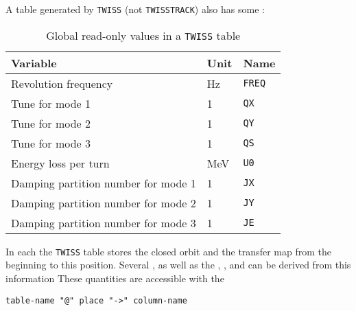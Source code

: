 A table generated by \texttt{TWISS} (not \texttt{TWISSTRACK})
also has some :
\begin{table}[Ht] \footnotesize
  \begin{center}
    \caption{Global read-only values in a \texttt{TWISS} table}
    \label{tab:twiss-glob}
    \begin{tabular}{|l|l|l|}
      \hline
      Variable & Unit & Name \\
      \hline
      Revolution frequency & Hz & \texttt{FREQ}\index{FREQ} \\
      Tune for mode 1 & 1 & \texttt{QX}\index{QX} \\
      Tune for mode 2 & 1 & \texttt{QY}\index{QY} \\
      Tune for mode 3 & 1 & \texttt{QS}\index{QS} \\
      Energy loss per turn & MeV & \texttt{U0}\index{U0} \\
      Damping partition number for mode 1 & 1 & \texttt{JX}\index{JX} \\
      Damping partition number for mode 2 & 1 & \texttt{JY}\index{JY} \\
      Damping partition number for mode 3 & 1 & \texttt{JE}\index{JE} \\
      \hline
    \end{tabular}
  \end{center}
\end{table}

In each the \texttt{TWISS} table stores the closed orbit and the
transfer map from the beginning to this position.
Several ,
as well as the ,
,
and  can be derived from this
information
These quantities are accessible with the 
\begin{verbatim}
table-name "@" place "->" column-name
\end{verbatim}

